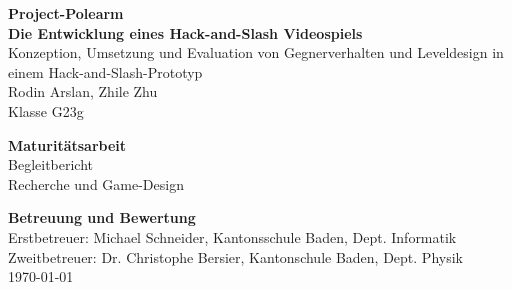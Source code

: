 \documentclass[10pt]{article}
\begin{document}

\begin{titlepage}
    \begin{center}
        \vspace*{2cm}

        \textbf{\Huge{Project-Polearm}} \\ [2em]
        \textbf{\Large Die Entwicklung eines Hack-and-Slash Videospiels} \\ [0.6em]
        \large{Konzeption, Umsetzung und Evaluation von Gegnerverhalten und Leveldesign in einem Hack-and-Slash-Prototyp} \\ [2em]

        \Large{Rodin Arslan, Zhile Zhu} \\ [0.5em]
        \large{Klasse G23g}

        \vspace{3cm}

        \LARGE{\textbf{Maturitätsarbeit}} \\ [0.3em]
        \Large{Begleitbericht} \\
        \large{Recherche und Game-Design}

        \vfill

        \Large{\textbf{Betreuung und Bewertung}} \\ [0.5em]
        \large{Erstbetreuer: Michael Schneider, Kantonsschule Baden, Dept. Informatik} \\
        \large{Zweitbetreuer: Dr. Christophe Bersier, Kantonschule Baden, Dept. Physik} \\

        \vspace{2cm}
        \large{\today}
    \end{center}
\end{titlepage}

\newpage

\end{document}
